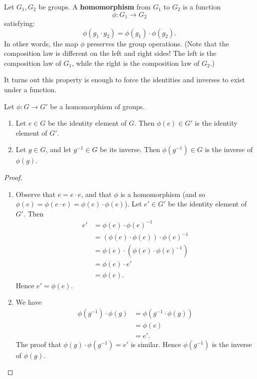 \documentclass[math1530-lecture-notes]{subfiles}
\begin{document}
\begin{definition}[Homomorphisms]{}
  Let $ G_1, G_2$ be groups. A \textbf{homomorphism} from $G_1$ to $G_2$ is a function \[
    \phi: G_1\to G_2\]
    satisfying: \[
    \phi(g_1\cdot g_2)=\phi(g_1)\cdot\phi(g_2)
  .\] In other words, the map $\phi$ preserves the group operations. (Note that the composition law
  is different on the left and right sides! The left is the composition law of $G_1$, while the
  right is the composition law of $ G_2$.)
\end{definition}

It turns out this property is enough to force the identities and inverses to exist under a function.

\begin{proposition}[]{}
  Let $\phi:G\to G'$ be a homomorphism of groups.
  \begin{enumerate}
    \item Let $e\in G$ be the identity element of $G$. Then $\phi(e)\in G'$ is the identity element
      of $G'$.
    \item Let $g\in G$, and let $g^{-1}\in G$ be its inverse. Then $ \phi(g^{-1})\in G$ is the
      inverse of $\phi(g)$.
  \end{enumerate}
\end{proposition}
\begin{proof}[Proof]
  \begin{enumerate}
    \item Observe that $e=e\cdot e$, and that $\phi$ is a homomorphism (and so $\phi(e)=\phi(e\cdot
      e)=\phi(e)\cdot \phi(e)$). Let $e'\in G'$ be the identity element of $G'$. Then
      \begin{align*}
        e' &= \phi(e)\cdot \phi(e)^{-1}\\
           &= (\phi(e)\cdot \phi(e))\cdot \phi(e)^{-1} \\
           &= \phi(e)\cdot (\phi(e)\cdot \phi(e)^{-1}) \\
           &= \phi(e)\cdot e' \\
           &= \phi(e)
      .\end{align*}
      Hence $e'=\phi(e)$.
    \item We have 
      \begin{align*}
        \phi(g^{-1})\cdot \phi(g) &= \phi(g^{-1}\cdot \phi(g)) \\
                                  &= \phi(e) \\
                                  &= e'
      .\end{align*}
      The proof that $\phi(g)\cdot \phi(g^{-1})=e'$ is similar. Hence $\phi(g^{-1})$ is the inverse of $\phi(g)$.
  \end{enumerate}
\end{proof}
\end{document}
